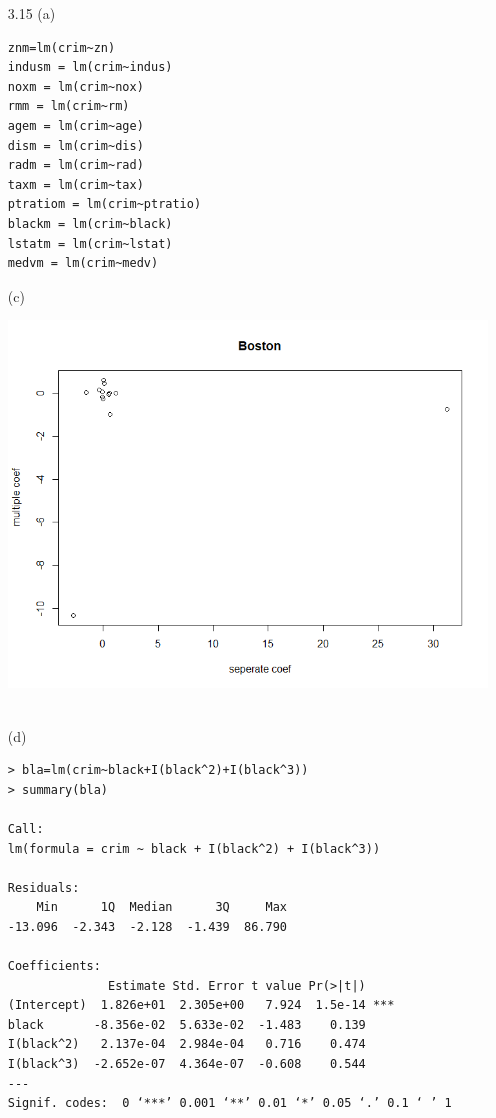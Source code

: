 \documentclass[12pt]{article}
\begin{document}
\begin{itemize}
\item[3.15]
(a)
\begin{verbatim}
znm=lm(crim~zn)
indusm = lm(crim~indus)
noxm = lm(crim~nox)
rmm = lm(crim~rm)
agem = lm(crim~age)
dism = lm(crim~dis)
radm = lm(crim~rad)
taxm = lm(crim~tax)
ptratiom = lm(crim~ptratio)
blackm = lm(crim~black)
lstatm = lm(crim~lstat)
medvm = lm(crim~medv)
\end{verbatim}
(c)\\
\centerline{\includegraphics[width=0.8\linewidth]{boston}}\\
(d)
\begin{verbatim}
> bla=lm(crim~black+I(black^2)+I(black^3))
> summary(bla)

Call:
lm(formula = crim ~ black + I(black^2) + I(black^3))

Residuals:
    Min      1Q  Median      3Q     Max
-13.096  -2.343  -2.128  -1.439  86.790

Coefficients:
              Estimate Std. Error t value Pr(>|t|)
(Intercept)  1.826e+01  2.305e+00   7.924  1.5e-14 ***
black       -8.356e-02  5.633e-02  -1.483    0.139
I(black^2)   2.137e-04  2.984e-04   0.716    0.474
I(black^3)  -2.652e-07  4.364e-07  -0.608    0.544
---
Signif. codes:  0 ‘***’ 0.001 ‘**’ 0.01 ‘*’ 0.05 ‘.’ 0.1 ‘ ’ 1


\end{verbatim}
\end{itemize}
\end{document}
